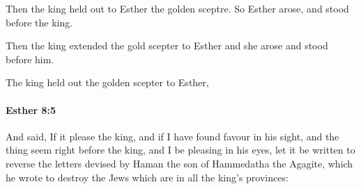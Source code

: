 			\begin{versebox}
					\item[BHS] 
					\item[LXX] 
					\item[ASV] Then the king held out to Esther the golden sceptre. So Esther arose, and stood before the king.
					\item[NIV] Then the king extended the gold scepter to Esther and she arose and stood before him.
					\item[NRSV] The king held out the golden scepter to Esther,
			\end{versebox}

		\paragraph{Esther 8:5} %
			\label{ESTHER-8-5}

			And said, If it please the king, and if I have found favour in his sight, and the thing seem right before the king, and I be pleasing in his eyes, let it be written to reverse the letters devised by Haman the son of Hammedatha the Agagite, which he wrote to destroy the Jews which are in all the king’s provinces:

